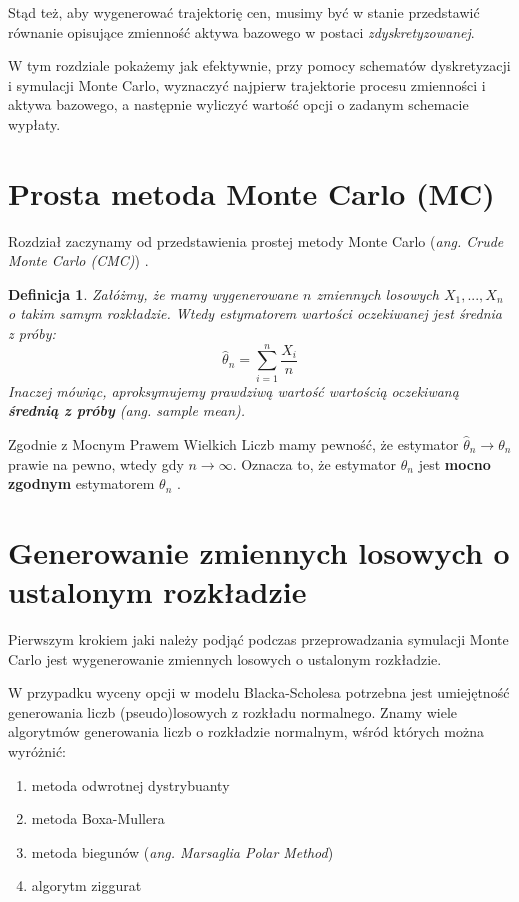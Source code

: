 \documentclass{pracamgr}
\newtheorem{defi}{Definicja}[section]
\begin{document}
{Stąd też, aby wygenerować trajektorię cen, musimy być w stanie przedstawić równanie opisujące
zmienność aktywa bazowego w postaci \textit{zdyskretyzowanej}.

W tym rozdziale pokażemy jak efektywnie, przy pomocy schematów dyskretyzacji i symulacji Monte Carlo, 
wyznaczyć najpierw trajektorie procesu zmienności i aktywa bazowego, a następnie wyliczyć wartość
opcji o zadanym schemacie wypłaty.

\section{Prosta metoda Monte Carlo (MC)}
\label{sec:mc}

Rozdział zaczynamy od przedstawienia prostej metody 
Monte Carlo (\textit{ang. Crude Monte Carlo (CMC)}) \cite{Niemiro}.

\begin{defi}
Załóżmy, że mamy wygenerowane $n$ zmiennych losowych $X_1, ..., X_n$ o takim samym rozkładzie. Wtedy estymatorem wartości
oczekiwanej jest średnia z próby:
\begin{equation}
  \hat{\theta}_n = \sum_{i=1}^n \frac{X_i}{n}
\end{equation}
Inaczej mówiąc, aproksymujemy prawdziwą wartość wartością oczekiwaną \textbf{średnią z próby} (\textit{ang. sample mean}).
\end{defi}


Zgodnie z Mocnym Prawem Wielkich Liczb mamy pewność, że estymator 
$\hat{\theta}_n \rightarrow \theta_n$ prawie na pewno, wtedy gdy $n \rightarrow \infty$. 
Oznacza to, że estymator $\hat{\theta}_n $ jest \textbf{mocno zgodnym} 
estymatorem $\theta_n$ \cite{Glasserman}.



\section{Generowanie zmiennych losowych o ustalonym rozkładzie}
\label{sec:genRV}

Pierwszym krokiem jaki należy podjąć podczas przeprowadzania symulacji Monte Carlo jest 
wygenerowanie zmiennych losowych o ustalonym rozkładzie.

W przypadku wyceny opcji w modelu Blacka-Scholesa potrzebna jest umiejętność generowania liczb 
(pseudo)losowych z rozkładu normalnego. Znamy wiele algorytmów generowania liczb o rozkładzie
normalnym, wśród których można wyróżnić:
\begin{enumerate}
  \item metoda odwrotnej dystrybuanty
  \item metoda Boxa-Mullera
  \item metoda biegunów (\textit{ang. Marsaglia Polar Method})  \cite{Marsaglia}
  \item algorytm ziggurat
\end{enumerate}

}
\end{document}
